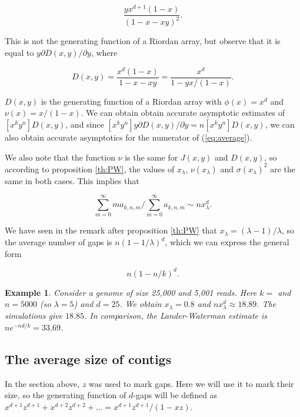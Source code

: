 \documentclass{article}
\newtheorem{example}{Example}
\begin{document}
\begin{equation*}
\frac{yx^{d+1}(1-x)}{\left(1-x-xy\right)^2}.
\end{equation*}

This is not the generating function of a Riordan array, but observe that
it is equal to $y\partial D(x,y)/\partial y$, where

\begin{equation*}
D(x,y) = \frac{x^d(1-x)}{1-x-xy} =
\frac{x^d}{1-yx/(1-x)}.
\end{equation*}

$D(x,y)$ is the generating function of a Riordan array with $\phi(x) =
x^d$ and $\nu(x) = x/(1-x)$. We can obtain obtain accurate asymptotic
estimates of $[x^ky^n]D(x,y)$, and since $[x^ky^n]y\partial D(x,y) /
\partial y = n[x^ky^n]D(x,y)$, we can also obtain accurate asymptotics for
the numerator of (\ref{eq:average}).

We also note that the function $\nu$ is the same for $J(x,y)$ and
$D(x,y)$, so according to proposition \ref{th:PW}, the values of
$x_\lambda$, $\nu(x_\lambda)$ and $\sigma(x_\lambda)^2$ are the same in
both cases. This implies that

\begin{equation*}
\sum_{m=0}^\infty ma_{k,n,m}\Big/\sum_{m=0}^\infty a_{k,n,m} \sim
n x_\lambda^d.
\end{equation*}

We have seen in the remark after proposition \ref{th:PW} that $x_\lambda =
(\lambda-1)/\lambda$, so the average number of gaps is $n(1-1/\lambda)^d$,
which we can express the general form

\begin{equation*}
n\left(1-n/k\right)^d.
\end{equation*}

\begin{example}
Consider a genome of size 25,000 and 5,001 reads. Here $k = $ and $n =
5000$ (so $\lambda = 5$) and $d = 25$. We obtain $x_\lambda = 0.8$
and $n x_\lambda^d \approx 18.89$. The simulations give
$18.85$. In comparison, the Lander-Waterman estimate is $ne^{-nd/k} =
33.69$.
\end{example}

\subsection{The average size of contigs}

In the section above, $z$ was used to mark gaps. Here we will use it to
mark their size, so the generating function of $d$-gaps will be defined as
$x^{d+1}z^{d+1} + x^{d+2}z^{d+2} + \ldots = x^{d+1}z^{d+1}/(1-xz)$.
\end{document}
